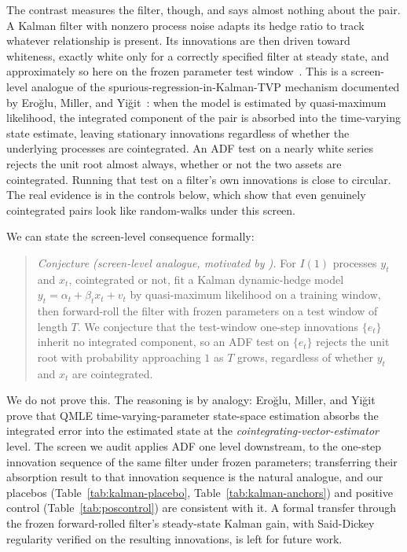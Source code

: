 \documentclass[11pt]{article}
\begin{document}
The contrast measures the filter, though, and says almost nothing about the pair. A Kalman filter with nonzero process noise
adapts its hedge ratio to track whatever relationship is present. Its innovations are then
driven toward whiteness, exactly white only for a correctly specified filter at steady state,
and approximately so here on the frozen parameter test window~\cite{harvey1989structural}. This
is a screen-level analogue of the spurious-regression-in-Kalman-TVP mechanism documented by
Ero\u{g}lu, Miller, and Yi\u{g}it~\cite{eroglu2022tvc}: when the model is estimated by
quasi-maximum likelihood, the integrated component of the pair is absorbed into the
time-varying state estimate, leaving stationary innovations regardless of whether the
underlying processes are cointegrated. An ADF test on a nearly white
series rejects the unit root almost always, whether or not the two assets are cointegrated. Running
that test on a filter's own innovations is close to circular. The real evidence is in the controls
below, which show that even genuinely cointegrated pairs look like random-walks under this screen.

We can state the screen-level consequence formally:

\begin{quote}
\emph{Conjecture (screen-level analogue, motivated by \cite{eroglu2022tvc}).}
For $I(1)$ processes $y_t$ and $x_t$, cointegrated or not, fit a Kalman dynamic-hedge
model $y_t = \alpha_t + \beta_t x_t + v_t$ by quasi-maximum likelihood on a training
window, then forward-roll the filter with frozen parameters on a test window of length
$T$. We conjecture that the test-window one-step innovations $\{e_t\}$ inherit no
integrated component, so an ADF test on $\{e_t\}$ rejects the unit root with probability
approaching $1$ as $T$ grows, regardless of whether $y_t$ and $x_t$ are cointegrated.
\end{quote}

We do not prove this. The reasoning is by analogy: Ero\u{g}lu, Miller, and
Yi\u{g}it~\cite{eroglu2022tvc} prove that QMLE time-varying-parameter state-space
estimation absorbs the integrated error into the estimated state at the
\emph{cointegrating-vector-estimator} level. The screen we audit applies ADF one level
downstream, to the one-step innovation sequence of the same filter under frozen
parameters; transferring their absorption result to that innovation sequence is the natural
analogue, and our placebos (Table~\ref{tab:kalman-placebo}, Table~\ref{tab:kalman-anchors})
and positive control (Table~\ref{tab:poscontrol}) are consistent with it. A formal transfer
through the frozen forward-rolled filter's steady-state Kalman gain, with Said-Dickey
regularity verified on the resulting innovations, is left for future work.
\end{document}
